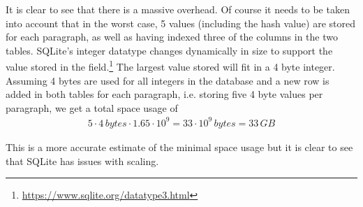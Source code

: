 It is clear to see that there is a massive overhead. Of course it needs to be taken into account that in the worst case, 5 values (including the hash value) are stored for each paragraph, as well as having indexed three of the columns in the two tables. SQLite's integer datatype changes dynamically in size to support the value stored in the field.\footnote{\url{https://www.sqlite.org/datatype3.html}} The largest value stored will fit in a 4 byte integer. Assuming 4 bytes are used for all integers in the database and a new row is added in both tables for each paragraph, i.e. storing five 4 byte values per paragraph, we get a total space usage of
\begin{align*}
    5 \cdot 4\, \textit{bytes} \cdot 1.65 \cdot 10^9 = 33 \cdot 10^9\, \textit{bytes} = 33\, \textit{GB}
\end{align*}

This is a more accurate estimate of the minimal space usage but it is clear to see that SQLite has issues with scaling.